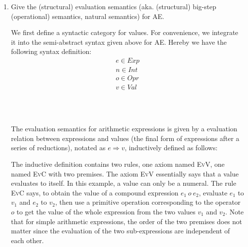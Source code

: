\documentclass[a4paper,12pt]{article}
\newcommand{\term}[1]{\textsf{#1}}
\newcommand{\appl}[2]{#1\inparens{#2}}
\newcommand{\eval}[2]{#1 \Longrightarrow #2}
\begin{document}
\begin{enumerate}
 \item Give the \term{(structural) evaluation semantics} (aka. \term{(structural)
  big-step (operational) semantics}, \term{natural semantics}) for AE.

  We first define a syntactic category for values.  For convenience, we integrate
  it into the semi-abstract syntax given above for AE.  Hereby we have the following
  syntax definition:
  \begin{gather*}
   e \in Exp \\
   n \in Int \\
   o \in Opr \\
   v \in Val
  \end{gather*}

  \begin{grammar}
   \\
   \\
  \end{grammar}
  
  The evaluation semantics for arithmetic expressions is given by a evaluation relation
  between expressions and values (the final form of expressions after a series of
  reductions), notated as $\eval{e}{v}$, inductively defined as follows:
  The inductive definition contains two rules, one axiom named \textsc{EvV}, one named
  \textsc{EvC} with two premises. The axiom \textsc{EvV} essentially says that a value
  evaluates to itself. In this example, a value can only be a numeral. The rule
  \textsc{EvC} says, to obtain the value of a compound expression $e_1\ o\ e_2$, evaluate
  $e_1$ to $v_1$ and $e_2$ to $v_2$, then use a primitive operation corresponding to the
  operator $o$ to get the value of the whole expression from the two values $v_1$ and $v_2$.
  Note that for simple arithmetic expressions, the order of the two premises does not
  matter since the evaluation of the two sub-expressions are independent of each other.


\end{enumerate}
\end{document}
